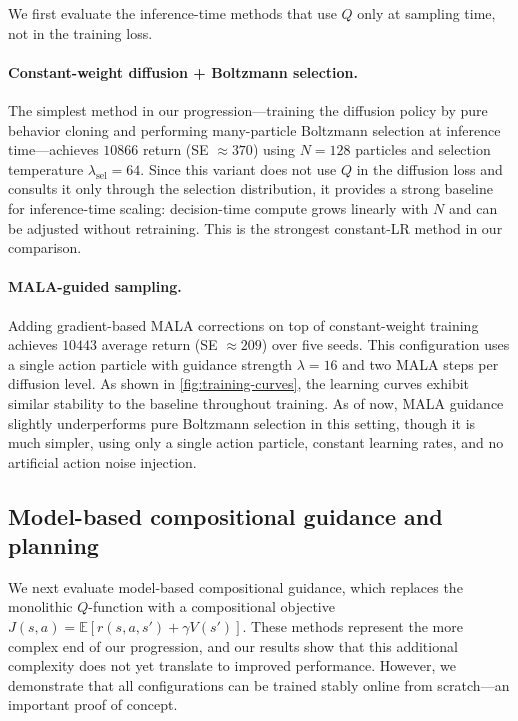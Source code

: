 \documentclass{article}
\theoremstyle{plain}
\theoremstyle{definition}
\theoremstyle{remark}
\begin{document}
We first evaluate the inference-time methods that use $Q$ only at sampling time, not in the training loss.

\paragraph{Constant-weight diffusion + Boltzmann selection.}
The simplest method in our progression---training the diffusion policy by pure behavior cloning and performing many-particle Boltzmann selection at inference time---achieves $10866$ return (SE $\approx 370$) using $N=128$ particles and selection temperature $\lambda_{\text{sel}}=64$.
Since this variant does not use $Q$ in the diffusion loss and consults it only through the selection distribution, it provides a strong baseline for inference-time scaling: decision-time compute grows linearly with $N$ and can be adjusted without retraining.
This is the strongest constant-LR method in our comparison.

\paragraph{MALA-guided sampling.}
Adding gradient-based MALA corrections on top of constant-weight training achieves $10443$ average return (SE $\approx 209$) over five seeds.
This configuration uses a single action particle with guidance strength $\lambda=16$ and two MALA steps per diffusion level.
As shown in \cref{fig:training-curves}, the learning curves exhibit similar stability to the baseline throughout training.
As of now, MALA guidance slightly underperforms pure Boltzmann selection in this setting, though it is much simpler, using only a single action particle, constant learning rates, and no artificial action noise injection.


\subsection{Model-based compositional guidance and planning}

We next evaluate model-based compositional guidance, which replaces the monolithic $Q$-function with a compositional objective $J(s,a) = \mathbb{E}[r(s,a,s') + \gamma V(s')]$.
These methods represent the more complex end of our progression, and our results show that this additional complexity does not yet translate to improved performance.
However, we demonstrate that all configurations can be trained stably online from scratch---an important proof of concept.
\end{document}
